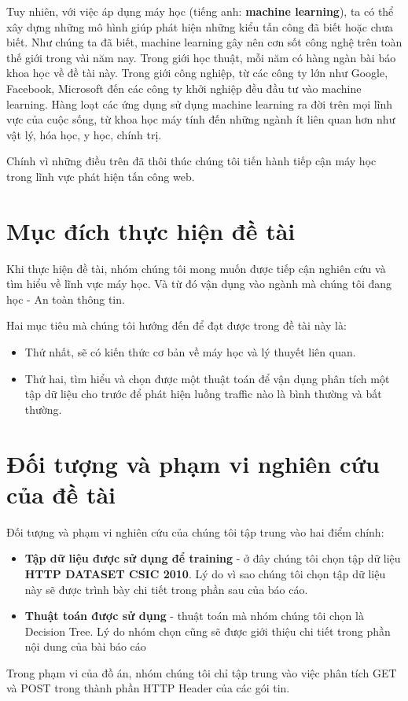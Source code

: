 \documentclass[../main-report.tex]{subfiles}
\begin{document}
Tuy nhiên, với việc áp dụng máy học (tiếng anh: \textbf{machine learning}), ta có thể xây dựng những mô hình giúp phát hiện những kiểu tấn công đã biết hoặc chưa biết. Như chúng ta đã biết, machine learning gây nên cơn sốt công nghệ trên toàn thế giới trong vài năm nay. Trong giới học thuật, mỗi năm có hàng ngàn bài báo khoa học về đề tài này. Trong giới công nghiệp, từ các công ty lớn như Google, Facebook, Microsoft đến các công ty khởi nghiệp đều đầu tư vào machine learning. Hàng loạt các ứng dụng sử dụng machine learning ra đời trên mọi lĩnh vực của cuộc sống, từ khoa học máy tính đến những ngành ít liên quan hơn như vật lý, hóa học, y học, chính trị.

Chính vì những điều trên đã thôi thúc chúng tôi tiến hành tiếp cận máy học trong lĩnh vực phát hiện tấn công web.

\section*{Mục đích thực hiện đề tài}
Khi thực hiện đề tài, nhóm chúng tôi mong muốn được tiếp cận nghiên cứu và tìm hiểu về lĩnh vực máy học. Và từ đó vận dụng vào ngành mà chúng tôi đang học - An toàn thông tin.

Hai mục tiêu mà chúng tôi hướng đến để đạt được trong đề tài này là:

\begin{itemize}
\item Thứ nhất, sẽ có kiến thức cơ bản về máy học và lý thuyết liên quan.
\item Thứ hai, tìm hiểu và chọn được một thuật toán để vận dụng phân tích một tập dữ liệu cho trước để phát hiện luồng traffic nào là bình thường và bất thường.
\end{itemize}

\section*{Đối tượng và phạm vi nghiên cứu của đề tài}
Đối tượng và phạm vi nghiên cứu của chúng tôi tập trung vào hai điểm chính:

\begin{itemize}
\item \textbf{Tập dữ liệu được sử dụng để training} - ở đây chúng tôi chọn tập dữ liệu \textbf{HTTP DATASET CSIC 2010}. Lý do vì sao chúng tôi chọn tập dữ liệu này sẽ được trình bày chi tiết trong phần sau của báo cáo.
\item \textbf{Thuật toán được sử dụng} - thuật toán mà nhóm chúng tôi chọn là Decision Tree. Lý do nhóm chọn cũng sẽ được giới thiệu chi tiết trong phần nội dung của bài báo cáo
\end{itemize}

Trong phạm vi của đồ án, nhóm chúng tôi chỉ tập trung vào việc phân tích GET và POST trong thành phần HTTP Header của các gói tin.
\end{document}
